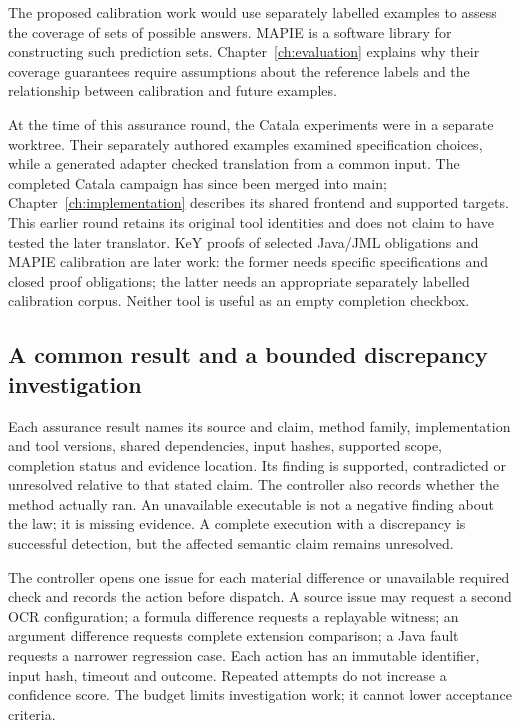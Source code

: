 The proposed calibration work would use separately labelled examples to assess
the coverage of sets of possible answers. MAPIE is a software library for
constructing such prediction sets. Chapter~\ref{ch:evaluation} explains why
their coverage guarantees require assumptions about the reference labels and
the relationship between calibration and future examples.

At the time of this assurance round, the Catala experiments were in a separate
worktree. Their separately authored examples examined specification choices,
while a generated adapter checked translation from a common input. The completed
Catala campaign has since been merged into main; Chapter~\ref{ch:implementation}
describes its shared frontend and supported targets. This earlier round retains
its original tool identities and does not claim to have tested the later
translator. KeY proofs of selected Java/JML obligations and MAPIE calibration
are later work: the former needs specific specifications and closed proof
obligations; the latter needs an appropriate separately labelled calibration
corpus. Neither tool is useful as an empty completion checkbox.

\subsection{A common result and a bounded discrepancy investigation}

Each assurance result names its source and claim, method family, implementation
and tool versions, shared dependencies, input hashes, supported scope, completion
status and evidence location. Its finding is supported, contradicted or
unresolved relative to that stated claim. The controller also records whether
the method actually ran. An unavailable executable is not a negative finding
about the law; it is missing evidence. A complete execution with a discrepancy
is successful detection, but the affected semantic claim remains unresolved.

The controller opens one issue for each material difference or unavailable
required check and records the action before dispatch. A source issue may request
a second OCR configuration; a formula difference requests a replayable witness;
an argument difference requests complete extension comparison; a Java fault
requests a narrower regression case. Each action has an immutable identifier,
input hash, timeout and outcome. Repeated attempts do not increase a confidence
score. The budget limits investigation work; it cannot lower acceptance criteria.

